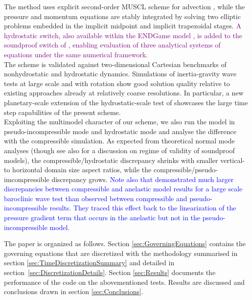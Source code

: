 \documentclass{ametsoc}
\newcommand{\purple}[1]{\textcolor{purple}{#1}}
\newcommand{\blue}[1]{\textcolor{blue}{#1}}
\newcommand{\sblue}[1]{\textcolor{sblue}{#1}}
\newcommand{\tommaso}[1]{\purple{#1}}
\newcommand{\rupert}[1]{\blue{#1}}
\newcommand{\revision}[1]{\sblue{#1}}
\theoremstyle{definition}
\begin{document}
The method uses explicit second-order MUSCL scheme for advection \citep{vanLeer2006}, while the pressure and momentum equations are stably integrated by solving two elliptic problems embedded in the implicit midpoint and implicit trapezoidal stages. \tommaso{A hydrostatic switch, also available within the ENDGame model \citep{MelvinEtAl2010}, is added to the soundproof switch of \citet{BenacchioEtAl2014}, enabling evaluation of three analytical systems of equations under the same numerical framework.}\\ The scheme is validated against two-dimensional Cartesian benchmarks of nonhydrostatic and hydrostatic dynamics. Simulations of inertia-gravity wave tests at large scale and with rotation show \revision{good solution quality relative} to existing approaches already at relatively coarse resolutions. In particular, a new planetary-scale extension of the hydrostatic-scale test of \cite{SkamarockKlemp1994} showcases the large time step capabilities of the present scheme.\\ \revision{Exploiting the multimodel character  of our scheme}, we also run the model in pseudo-incompressible mode and hydrostatic mode and analyse the difference with the compressible simulation. As expected from theoretical normal mode analyses \citep{DaviesEtAl2003, Dukowicz2013} (though see also \cite{KleinEtAl2010} for a discussion on regime of validity of soundproof models), the compressible/hydrostatic discrepancy shrinks with smaller vertical-to horizontal domain size aspect ratios, while the compressible/pseudo-imcompressible discrepancy \revision{grows}. \rupert{Note also that \citet{SmolarkiewiczEtAl2014} demonstrated much larger discrepancies between compressible and anelastic model results for a large scale baroclinic wave test than observed between compressible and pseudo-incompressible results. They traced this effect back to the linearization of the pressure gradient term that occurs in the anelastic but not in the pseudo-incompressible model.}

The paper is organized as follows. Section \ref{sec:GoverningEquations} contains the governing equations that are discretized with the methodology summarised in section \ref{sec:TimeDiscretizationSummary} and detailed in section~\ref{sec:DiscretizationDetails}. Section \ref{sec:Results} documents the performance of the code on the abovementioned tests. Results are discussed and conclusions drawn in section \ref{sec:Conclusions}. 

\end{document}
